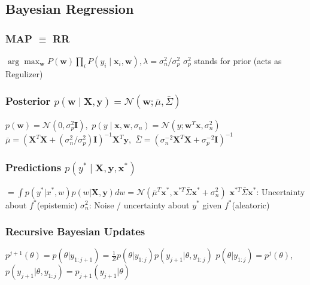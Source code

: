 \documentclass[a4paper, 11pt, landscape]{article}
\begin{document}
\begin{multicols*}{3}
\subsection{Bayesian Regression}

\subsubsection{MAP $\equiv$ RR}
$\arg \max _{\mathbf{w}} P(\mathbf{w}) \prod_{i} P\left(y_{i} \mid \mathbf{x}_{i}, \mathbf{w}\right),$\space$\lambda = {\sigma_n^2}/{\sigma_p^2}$
\newline $\sigma_p^2$ stands for prior (acts as Regulizer)

\subsubsection{Posterior $p(\mathbf{w} \mid \mathbf{X}, \mathbf{y})=\mathcal{N}(\mathbf{w} ; \bar{\mu}, \bar{\Sigma})$}
$p(\mathbf{w})=\mathcal{N}(0, \sigma_p^2 \mathbf{I}),$
        \space\space\space $p\left(y \mid \mathbf{x}, \mathbf{w}, \sigma_{n}\right)=\mathcal{N}\left(y ; \mathbf{w}^{T} \mathbf{x}, \sigma_{n}^{2}\right)$
\newline $\bar{\mu}=\left(\mathbf{X}^{T} \mathbf{X}+(\sigma_{n}^{2}/\sigma_p^2) \mathbf{I}\right)^{-1} \mathbf{X}^{T} \mathbf{y},$
        \space\space\space $\bar{\Sigma}=\left(\sigma_{n}^{-2} \mathbf{X}^{T} \mathbf{X}+\sigma_p^{-2}\mathbf{I}\right)^{-1}$

\subsubsection{Predictions $p\left(y^{*} \mid \mathbf{X}, \mathbf{y}, \mathbf{x}^{*}\right)$}
$= \int p(y^{*}|x^{*},w)p(w|\mathbf{X}, \mathbf{y})dw=\mathcal{N}\left(\bar{\mu}^{T} \mathbf{x}^{*}, \mathbf{x}^{* T} \bar{\Sigma} \mathbf{x}^{*}+\sigma_{n}^{2}\right)$
\newline $\mathbf{x}^{* T} \bar{\Sigma} \mathbf{x}^{*}$: Uncertainty about $f^*$(epistemic)
\newline $\sigma_{n}^{2}$: Noise / uncertainty about $y^*$ given $f^*$(aleatoric)

\subsubsection{Recursive Bayesian Updates}
$p^{j+1}(\theta) = p(\theta|y_{1:j+1}) = \frac{1}{Z}p(\theta|y_{1:j})p(y_{j+1}|\theta,y_{1:j})$
\newline $p(\theta|y_{1:j}) = p^{j}(\theta)$, $p(y_{j+1}|\theta,y_{1:j}) = p_{j+1}(y_{j+1}|\theta)$


\end{multicols*}
\end{document}
